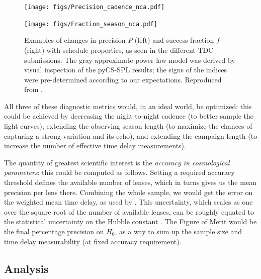 \begin{figure}[!ht]
  \capstart
  \begin{minipage}[b]{\linewidth}
    \begin{minipage}[b]{0.48\linewidth}
      \centering\texttt{[image: figs/Precision\_cadence\_nca.pdf]}
    \end{minipage} \hfill
    \begin{minipage}[b]{0.48\linewidth}
      \centering\texttt{[image: figs/Fraction\_season\_nca.pdf]}
    \end{minipage}
  \end{minipage}
\caption{Examples of changes in precision $P$
(left) and success fraction $f$ (right) with schedule properties, as
seen in the different TDC submissions. The gray approximate power law
model was derived by visual inspection of the pyCS-SPL results; the
signs of the indices were pre-determined according to our expectations.
Reproduced from \citet{LiaoEtal2015}.}
\label{fig:tdcresults}
\end{figure}

All three of these diagnostic metrics would, in an ideal world, be
optimized: this could be achieved by decreasing the night-to-night
cadence (to better sample the light curves), extending the observing
season length (to maximize the chances of capturing a strong variation
and its echo), and extending the campaign length (to increase the number
of effective time delay measurements).

The quantity of greatest scientific interest is the {\it accuracy in
cosmological parameters}: this could be computed as follows. Setting a
required accuracy threshold  defines the available number of lenses,
which in turns gives us the mean precision per lens there. Combining the
whole sample, we would get the error on the weighted mean time delay, as
used by \citet{Coe+Moustakas2009}. This uncertainty, which scales as one
over the square root of the number of available lenses,  can be roughly
equated to the statistical uncertainty on the Hubble constant \citep{Coe+Moustakas2009,TM16}. The
Figure of Merit would be the final percentage precision on $H_0$, as a
way to sum up the sample size and time delay measurability (at fixed
accuracy requirement).


\subsection{\OpSim Analysis}
\label{sec:\secname:analysis}

